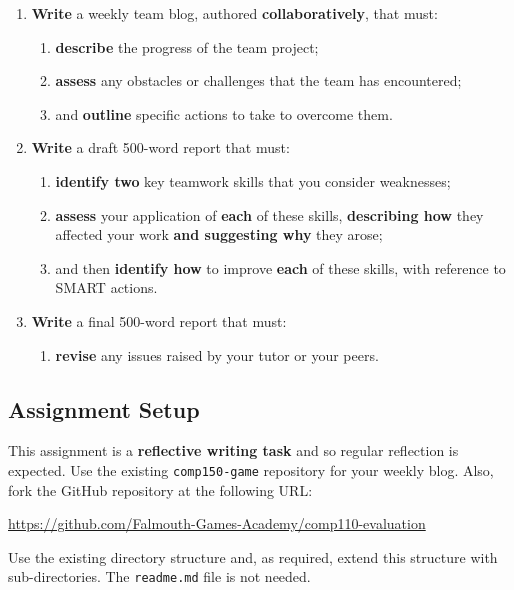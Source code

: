 \documentclass{../fal_assignment}
\begin{document}
\begin{enumerate}[label=(\alph*)]
    \item \textbf{Write} a weekly team blog, authored \textbf{collaboratively}, that must:
    	\begin{enumerate}[label=\roman*.]
    		\item \textbf{describe} the progress of the team project;
    		\item \textbf{assess} any obstacles or challenges that the team has encountered;
    		\item and \textbf{outline} specific actions to take to overcome them.
	\end{enumerate}
    \item \textbf{Write} a draft 500-word report that must:
    	\begin{enumerate}[label=\roman*.]
    		\item \textbf{identify two} key teamwork skills that you consider weaknesses;
    		\item \textbf{assess} your application of \textbf{each} of these skills, \textbf{describing how} they affected your work \textbf{and suggesting why} they arose;
    		\item and then \textbf{identify how} to improve \textbf{each} of these skills, with reference to SMART actions.
	\end{enumerate}
    \item \textbf{Write} a final 500-word report that must:
    	\begin{enumerate}[label=\roman*.]
    		\item \textbf{revise} any issues raised by your tutor or your peers.
	\end{enumerate}
\end{enumerate}

\subsection*{Assignment Setup}

This assignment is a \textbf{reflective writing task} and so regular reflection is expected. Use the existing \texttt{comp150-game} repository for your weekly blog. Also, fork the GitHub repository at the following URL:

\indent \url{https://github.com/Falmouth-Games-Academy/comp110-evaluation}

Use the existing directory structure and, as required, extend this structure with sub-directories. The \texttt{readme.md} file is not needed. 
\end{document}

